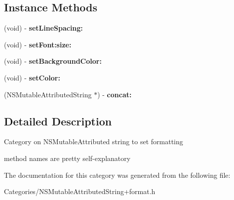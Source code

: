 \subsection*{Instance Methods}
\begin{DoxyCompactItemize}
\item 
\hypertarget{category_n_s_mutable_attributed_string_07formatting_08_adde7c6a1105a16916c27921124251a43}{(void) -\/ {\bfseries set\-Line\-Spacing\-:}}\label{category_n_s_mutable_attributed_string_07formatting_08_adde7c6a1105a16916c27921124251a43}

\item 
\hypertarget{category_n_s_mutable_attributed_string_07formatting_08_a8c7bf64f838778b5c3873e56b799f0a9}{(void) -\/ {\bfseries set\-Font\-:size\-:}}\label{category_n_s_mutable_attributed_string_07formatting_08_a8c7bf64f838778b5c3873e56b799f0a9}

\item 
\hypertarget{category_n_s_mutable_attributed_string_07formatting_08_a3c5d281f6ae1637ef2d3486f3924d43a}{(void) -\/ {\bfseries set\-Background\-Color\-:}}\label{category_n_s_mutable_attributed_string_07formatting_08_a3c5d281f6ae1637ef2d3486f3924d43a}

\item 
\hypertarget{category_n_s_mutable_attributed_string_07formatting_08_ad43c37002e2aa032c8a3d88acbb93feb}{(void) -\/ {\bfseries set\-Color\-:}}\label{category_n_s_mutable_attributed_string_07formatting_08_ad43c37002e2aa032c8a3d88acbb93feb}

\item 
\hypertarget{category_n_s_mutable_attributed_string_07formatting_08_a4621f48d21e21695854c2d00c870ec7e}{(N\-S\-Mutable\-Attributed\-String $\ast$) -\/ {\bfseries concat\-:}}\label{category_n_s_mutable_attributed_string_07formatting_08_a4621f48d21e21695854c2d00c870ec7e}

\end{DoxyCompactItemize}


\subsection{Detailed Description}
Category on N\-S\-Mutable\-Attributed string to set formatting

method names are pretty self-\/explanatory 

The documentation for this category was generated from the following file\-:\begin{DoxyCompactItemize}
\item 
Categories/N\-S\-Mutable\-Attributed\-String+format.\-h\end{DoxyCompactItemize}
